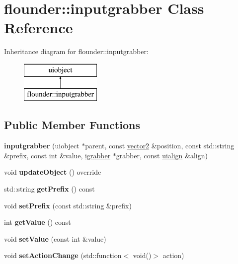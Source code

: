 \hypertarget{classflounder_1_1inputgrabber}{}\section{flounder\+:\+:inputgrabber Class Reference}
\label{classflounder_1_1inputgrabber}
Inheritance diagram for flounder\+:\+:inputgrabber\+:\begin{figure}[H]
\begin{center}
\leavevmode
\includegraphics[height=2.000000cm]{classflounder_1_1inputgrabber}
\end{center}
\end{figure}
\subsection*{Public Member Functions}
\begin{DoxyCompactItemize}
\item 
\mbox{\label{classflounder_1_1inputgrabber_a24c98328a702c7f1b08e5a4238bf582b}} 
{\bfseries inputgrabber} (uiobject $\ast$parent, const \hyperlink{classflounder_1_1vector2}{vector2} \&position, const std\+::string \&prefix, const int \&value, \hyperlink{classflounder_1_1igrabber}{igrabber} $\ast$grabber, const \hyperlink{namespaceflounder_a70f1871d5c05aa8e078dd37501ce10a9}{uialign} \&align)
\item 
\mbox{\label{classflounder_1_1inputgrabber_a407f628395380dbbed088a72070275be}} 
void {\bfseries update\+Object} () override
\item 
\mbox{\label{classflounder_1_1inputgrabber_af3aef3652b713be3e426d936cb760872}} 
std\+::string {\bfseries get\+Prefix} () const
\item 
\mbox{\label{classflounder_1_1inputgrabber_a57992f42cf715cf51ff7f8939460eea6}} 
void {\bfseries set\+Prefix} (const std\+::string \&prefix)
\item 
\mbox{\label{classflounder_1_1inputgrabber_a5500491abfaf13a0f4b6f5423f814623}} 
int {\bfseries get\+Value} () const
\item 
\mbox{\label{classflounder_1_1inputgrabber_af32f5813b6273019d2bf2515aaf88826}} 
void {\bfseries set\+Value} (const int \&value)
\item 
\mbox{\label{classflounder_1_1inputgrabber_a506c608651b423e3eba777f80e0295fb}} 
void {\bfseries set\+Action\+Change} (std\+::function$<$ void()$>$ action)
\end{DoxyCompactItemize}

